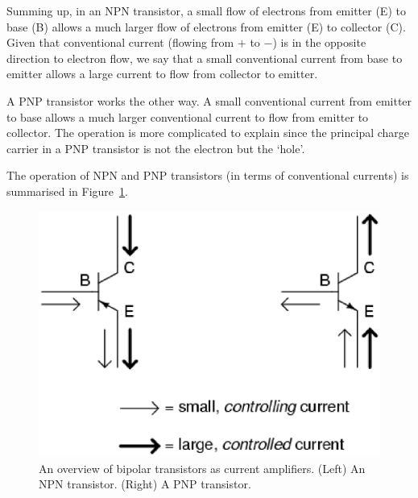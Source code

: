 Summing up, in an NPN transistor, a small flow of electrons from emitter (E) to base (B) allows a much larger flow of electrons from emitter (E) to collector (C).  Given that conventional current (flowing from $+$ to $-$) is in the opposite direction to electron flow, we say that a small conventional current from base to emitter allows a large current to flow from collector to emitter.

A PNP transistor works the other way.  A small conventional current from emitter to base allows a much larger conventional current to flow from emitter to collector.  The operation is more complicated to explain since the principal charge carrier in a PNP transistor is not the electron but the `hole'.

The operation of NPN and PNP transistors (in terms of conventional currents) is summarised in Figure~\ref{fig:transcur}.

\begin{figure}
\begin{center}
\includegraphics[scale=0.7]{../../epsimages/tranistorcurrents.eps}
\caption{An overview of bipolar transistors as current amplifiers. (Left) An NPN transistor. (Right) A PNP transistor.}
\label{fig:transcur}
\end{center}
\end{figure}

